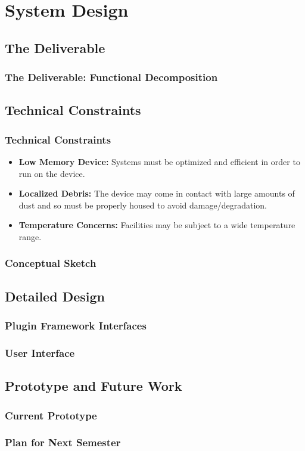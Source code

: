 \section{System Design}

\subsection{The Deliverable}
\begin{frame}
\frametitle{The Deliverable: Functional Decomposition}


\end{frame}

\subsection{Technical Constraints}
\begin{frame}
\frametitle{Technical Constraints}

\begin{itemize}
\item \textbf{Low Memory Device: }Systems must be optimized and efficient in order to run on the device.
\item \textbf{Localized Debris: }The device may come in contact with large amounts of dust and so must be properly housed to avoid damage/degradation.
\item \textbf{Temperature Concerns: }Facilities may be subject to a wide temperature range. 
\end{itemize}
\end{frame}

\begin{frame}
\frametitle{Conceptual Sketch}


\end{frame}

\subsection{Detailed Design}
\begin{frame}
\frametitle{Plugin Framework Interfaces}


\end{frame}

\begin{frame}
\frametitle{User Interface}


\end{frame}

\subsection{Prototype and Future Work}
\begin{frame}
\frametitle{Current Prototype}


\end{frame}

\begin{frame}
\frametitle{Plan for Next Semester}


\end{frame}
